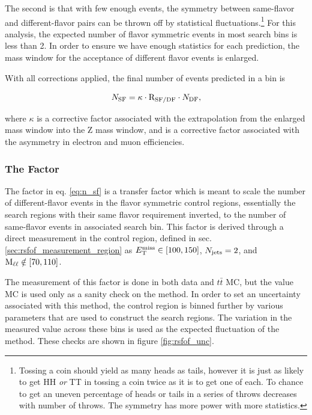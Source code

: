     The second is that with few enough events, the symmetry between same-flavor and different-flavor pairs can be thrown off by statistical fluctuations.\footnote{Tossing a coin should yield as many heads as tails, however it is just as likely to get HH \emph{or} TT in tossing a coin twice as it is to get one of each. To chance to get an uneven percentage of heads or tails in a series of throws decreases with number of throws. The symmetry has more power with more statistics.} For this analysis, the expected number of flavor symmetric events in most search bins is less than 2. In order to ensure we have enough statistics for each prediction, the mass window for the acceptance of different flavor events is enlarged.

    With all corrections applied, the final number of events predicted in a \MET bin is 

    \begin{equation}
      N_{\text{SF}} = \kappa \cdot \mathrm{R_{SF/DF}} \cdot N_{\text{DF}}, \label{eq:n_sf}
    \end{equation}

    where $\kappa$ is a corrective factor associated with the extrapolation from the enlarged mass window into the Z mass window, and \rsfof is a corrective factor associated with the asymmetry in electron and muon efficiencies.

    \subsubsection{The \rsfof Factor} \label{sec:rsfof}

      The factor \rsfof in eq. \ref{eq:n_sf} is a transfer factor which is meant to scale the number of different-flavor events in the flavor symmetric control regions, essentially the search regions with their same flavor requirement inverted, to the number of same-flavor events in associated search bin. This factor is derived through a direct measurement in the \rsfof control region, defined in sec. \ref{sec:rsfof_measurement_region} as $E_{\mathrm{T}}^{\text{miss}} \in [100,150]$, $N_{\mathrm{jets}} = 2$, and $\text{M}_{\ell\ell} \notin [70,110]$. 

      The measurement of this factor is done in both data and $t\bar{t}$ MC, but the value MC is used only as a sanity check on the method. In order to set an uncertainty associated with this method, the \rsfof control region is binned further by various parameters that are used to construct the search regions. The variation in the measured value across these bins is used as the expected fluctuation of the method. These checks are shown in figure \ref{fig:rsfof_unc}.

